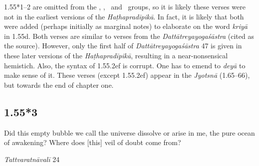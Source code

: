 \begin{ekdosis}
\begin{sources}[hp01_055_1]
\end{sources}


\begin{philcomm}[hp01_055_1]
1.55*1–2 are omitted from the \textalpha, \textgamma, \textdelta\ and \textepsilon\ groups, so it is likely these verses were not in the earliest versions of the \emph{Haṭhapradīpikā}. In fact, it is likely that both were added (perhaps initially as marginal notes) to elaborate on the word \emph{kriyā} in 1.55d. Both verses are similar to verses from the \emph{Dattātreyayogaśāstra} (cited as the source). However, only the first half of \emph{Dattātreyayogaśāstra} 47 is given in these later versions of the \emph{Haṭhapradīpikā}, resulting in a near-nonsensical hemistich. Also, the syntax of 1.55.2ef is corrupt. One has to emend to \emph{deyā} to make sense of it. These verses (except 1.55.2ef) appear in the \emph{Jyotsnā} (1.65–66), but towards the end of chapter one. 
\end{philcomm}




\subsection*{1.55*3}
\begin{translation}[hp01_055_3]
Did this empty bubble we call the universe dissolve or arise in me, the pure ocean of awakening? Where does [this] veil of doubt come from?
\end{translation}

\begin{sources}[hp01_055_3]
\emph{Tattvaratnāvalī} 24

\begin{versinnote}
\end{versinnote}


\end{sources}
\end{ekdosis}
